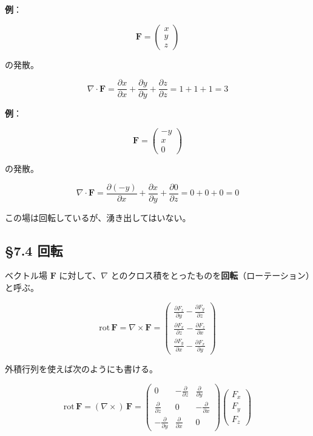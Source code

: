 \documentclass[a4paper,12pt,openany]{book}
\begin{document}
\textbf{例}：

\[
\mathbf{F}
=
\begin{pmatrix}
x\\
y\\
z
\end{pmatrix}
\]

の発散。

\[\nabla \cdot \mathbf{F} = \frac{\partial x}{\partial x} + \frac{\partial y}{\partial y} + \frac{\partial z}{\partial z} = 1 + 1 + 1 = 3\]

\textbf{例}：

\[
\mathbf{F}
=
\begin{pmatrix}
-y\\
x\\
0
\end{pmatrix}
\]

の発散。

\[\nabla \cdot \mathbf{F} = \frac{\partial (-y)}{\partial x} + \frac{\partial x}{\partial y} + \frac{\partial 0}{\partial z} = 0 + 0 + 0 = 0\]

この場は回転しているが、湧き出してはいない。

\par\vspace{0.35em}\par

\hypertarget{ux56deux8ee2}{%
\subsection{§7.4 回転}\label{ux56deux8ee2}}

ベクトル場 \(\mathbf{F}\) に対して、\(\nabla\)
とのクロス積をとったものを\textbf{回転}（ローテーション）と呼ぶ。

\[\mathrm{rot}\,\mathbf{F} = \nabla \times \mathbf{F} = \begin{pmatrix}
\frac{\partial F_z}{\partial y} - \frac{\partial F_y}{\partial z} \\[0.5em]
\frac{\partial F_x}{\partial z} - \frac{\partial F_z}{\partial x} \\[0.5em]
\frac{\partial F_y}{\partial x} - \frac{\partial F_x}{\partial y}
\end{pmatrix}\]

外積行列を使えば次のようにも書ける。

\[\mathrm{rot}\,\mathbf{F} = (\nabla \times)\,\mathbf{F} = \begin{pmatrix}
0 & -\frac{\partial}{\partial z} & \frac{\partial}{\partial y} \\[0.3em]
\frac{\partial}{\partial z} & 0 & -\frac{\partial}{\partial x} \\[0.3em]
-\frac{\partial}{\partial y} & \frac{\partial}{\partial x} & 0
\end{pmatrix}\begin{pmatrix}
F_x \\ F_y \\ F_z
\end{pmatrix}\]
\end{document}
